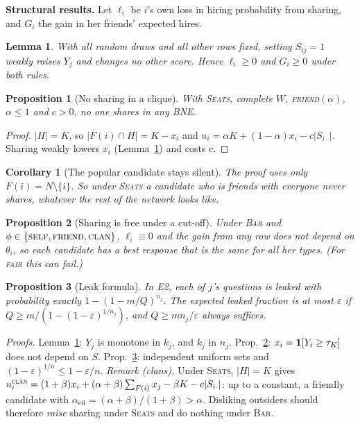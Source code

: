 \documentclass[conference]{IEEEtran}
\theoremstyle{plain}
\newtheorem{lemma}{Lemma}\newtheorem{proposition}{Proposition}\newtheorem{corollary}{Corollary}
\theoremstyle{definition}\newtheorem{definition}{Definition}
\newcommand{\seats}{\textsc{Seats}}\newcommand{\barr}{\textsc{Bar}}
\begin{document}
\textbf{Structural results.} Let $\ell_i$ be $i$'s own loss in hiring probability from sharing, and $G_i$ the gain in her friends' expected hires.
\begin{lemma}\label{lem:mono}With all random draws and all other rows fixed, setting $S_{ij}=1$ weakly raises $Y_j$ and changes no other score.
Hence $\ell_i\ge0$ and $G_i\ge0$ under both rules.\end{lemma}
\begin{proposition}[No sharing in a clique]\label{prop:clique}With \seats, complete $W$, \textsc{friend}$(\alpha)$, $\alpha\le1$ and $c>0$, no one shares in any BNE.\end{proposition}
\begin{proof}$|H|=K$, so $|F(i)\cap H|=K-x_i$ and $u_i=\alpha K+(1-\alpha)x_i-c|S_{i\cdot}|$. Sharing weakly lowers $x_i$ (Lemma~\ref{lem:mono}) and costs $c$.\end{proof}
\begin{corollary}[The popular candidate stays silent]\label{cor:hub}The proof uses only $F(i)=N\setminus\{i\}$. So under \seats{} a candidate who is friends with
\emph{everyone} never shares, whatever the rest of the network looks like.\end{corollary}
\begin{proposition}[Sharing is free under a cut-off]\label{prop:bar}Under \barr{} and $\phi\in\{\textsc{self},\textsc{friend},\textsc{clan}\}$, $\ell_i\equiv0$ and the gain from any
row does not depend on $\theta_i$, so each candidate has a best response that is the same for all her types. (For \textsc{fair} this can fail.)\end{proposition}
\begin{proposition}[Leak formula]\label{prop:leak}In E2, each of $j$'s questions is leaked with probability exactly $1-(1-m/Q)^{n_j}$. The expected leaked
fraction is at most $\varepsilon$ if $Q\ge m/(1-(1-\varepsilon)^{1/n_j})$, and $Q\ge mn_j/\varepsilon$ always suffices.\end{proposition}
\emph{Proofs.} Lemma~\ref{lem:mono}: $Y_j$ is monotone in $k_j$, and $k_j$ in $n_j$. Prop.~\ref{prop:bar}: $x_i=\mathbf{1}[Y_i\ge\tau_K]$ does not depend on $S$.
Prop.~\ref{prop:leak}: independent uniform sets and $(1-\varepsilon)^{1/n}\le1-\varepsilon/n$.
\emph{Remark (clans).} Under \seats, $|H|=K$ gives
$u_i^{\textsc{clan}}=(1+\beta)x_i+(\alpha+\beta)\sum_{F(i)}x_j-\beta K-c|S_{i\cdot}|$: up to a constant, a friendly candidate with
$\alpha_{\text{eff}}=(\alpha+\beta)/(1+\beta)>\alpha$. Disliking outsiders should therefore \emph{raise} sharing under \seats{} and do nothing under \barr.
\end{document}
